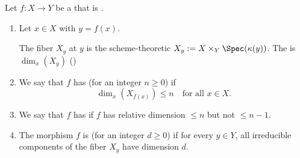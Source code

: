 \begin{definition} \label{definition:relative_dimension_for_a_morphism_of_schemes}
    Let $f\colon X \to Y$ be a  that is . 
    \begin{enumerate}
        \item Let $x \in X$ with $y = f(x)$. 
    
        The fiber $X_y$ at $y$ is the scheme-theoretic  $X_y := X \times_Y \Spec(\kappa(y))$. The  is $\dim_x(X_y)$ ()

        \item We say that $f$ has  (for an integer $n \geq 0$) if
        $$\dim_x(X_{f(x)}) \leq n \quad \text{for all } x \in X.$$

        \item We say that $f$ has  if $f$ has relative dimension $\leq n$ but not $\leq n - 1$.

        \item The morphism $f$ is  (for an integer $d \geq 0$) if for every $y \in Y$, all irreducible components of the fiber $X_y$ have dimension $d$.
    \end{enumerate}

\end{definition}
